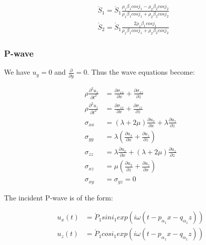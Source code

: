 \documentclass[workdone.tex]{subfiles}
\begin{document}
\begin{equation}
\begin{split}
& \grave S_1 = \acute S_1 \frac{\rho_1 \beta_1 cos j_1 - \rho_2 \beta_2 cos j_2}{\rho_1 \beta_1 cos j_1 + \rho_2 \beta_2 cos j_2} \\
& \acute S_2 = \acute S_1 \frac{2 \rho_1 \beta_1 cos j_1}{\rho_1 \beta_1 cos j_1 + \rho_2 \beta_2 cos j_2}
\end{split}
\end{equation}

\subsubsection{P-wave}

We have $u_y = 0$ and $\frac{\partial}{\partial y} = 0$. Thus the wave equations become:

\begin{equation}
\begin{split}
\rho \frac{\partial ^2 u_x}{\partial t^2} & = \frac{\partial \sigma_{xx}}{\partial x} + \frac{\partial \sigma_{xz}}{\partial z} \\
\rho \frac{\partial ^2 u_z}{\partial t^2} & = \frac{\partial \sigma_{zx}}{\partial x} + \frac{\partial \sigma_{zz}}{\partial z} \\
\sigma_{xx} & = (\lambda + 2 \mu) \frac{\partial u_x}{\partial x} + \lambda \frac{\partial u_z}{\partial z} \\
\sigma_{yy} & = \lambda (\frac{\partial u_x}{\partial x} + \frac{\partial u_z}{\partial z}) \\
\sigma_{zz} & = \lambda \frac{\partial u_x}{\partial x} + (\lambda + 2 \mu) \frac{\partial u_z}{\partial z} \\
\sigma_{xz} & = \mu (\frac{\partial u_x}{\partial z} + \frac{\partial u_z}{\partial x}) \\
\sigma_{xy} & = \sigma_{yz} = 0
\end{split}
\end{equation}

The incident P-wave is of the form:

\begin{equation}
\begin{split}
u_x (t) & = \acute P_1 sin i_1 exp (i \omega (t - p_{\alpha_1} x - q_{\alpha_1} z)) \\
u_z (t) & = \acute P_1 cos i_1 exp (i \omega (t - p_{\alpha_1} x - q_{\alpha_1} z))
\end{split}
\end{equation}
\end{document}
